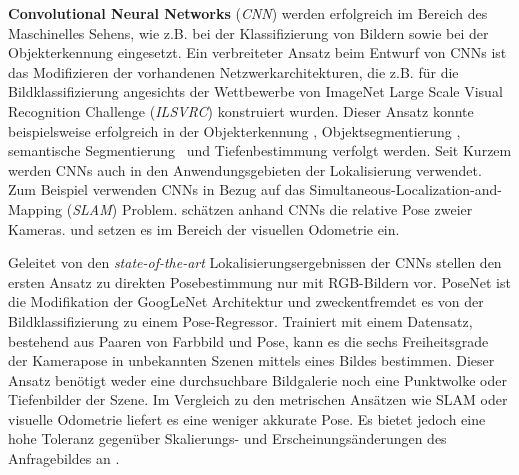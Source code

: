 \textbf{Convolutional Neural Networks} (\textit{CNN}) werden erfolgreich im Bereich des Maschinelles Sehens, wie z.B. bei der Klassifizierung von Bildern \cite{krizhevskyImageNetClassificationDeep2012, simonyanVeryDeepConvolutional2014, heDeepResidualLearning2015} sowie bei der Objekterkennung \cite{girshickRichFeatureHierarchies2013, renFasterRCNNRealTime2015b, girshickFastRCNN2015} eingesetzt. 
Ein verbreiteter Ansatz beim Entwurf von CNNs ist das Modifizieren der vorhandenen Netzwerkarchitekturen, die z.B. für die Bildklassifizierung angesichts der Wettbewerbe von ImageNet Large Scale Visual Recognition Challenge (\textit{ILSVRC}) \cite{russakovskyImageNetLargeScale2015} konstruiert wurden. Dieser Ansatz konnte beispielsweise erfolgreich in der Objekterkennung \cite{girshickFastRCNN2015}, Objektsegmentierung \cite{kokkinosPushingBoundariesBoundary2015, maninisConvolutionalOrientedBoundaries2016}, semantische Segmentierung \cite{nohLearningDeconvolutionNetwork2015, hazirbasFuseNetIncorporatingDepth2017a} und Tiefenbestimmung \cite{liDepthSurfaceNormal2015} verfolgt werden.
Seit Kurzem werden CNNs auch in den Anwendungsgebieten der Lokalisierung verwendet. Zum Beispiel verwenden  \citet{parisottoGlobalPoseEstimation2018} CNNs in Bezug auf das Simultaneous-Localization-and-Mapping (\textit{SLAM}) Problem. \citet{melekhovRelativeCameraPose2017} schätzen anhand CNNs die relative Pose zweier Kameras. \citet{costanteExploringRepresentationLearning2016} und \citet{wangDeepVOEndtoendVisual2017} setzen es im Bereich der visuellen Odometrie ein.

Geleitet von den \textit{state-of-the-art} Lokalisierungsergebnissen der CNNs stellen \citet{kendallPoseNetConvolutionalNetwork2015} den ersten Ansatz zu direkten Posebestimmung nur mit RGB-Bildern vor. PoseNet ist die Modifikation der GoogLeNet \cite{szegedyGoingDeeperConvolutions2015} Architektur und zweckentfremdet es von der Bildklassifizierung zu einem Pose-Regressor. Trainiert mit einem Datensatz, bestehend aus Paaren von Farbbild und Pose, kann es die sechs Freiheitsgrade der Kamerapose in unbekannten Szenen mittels eines Bildes bestimmen. Dieser Ansatz benötigt weder eine durchsuchbare Bildgalerie noch eine Punktwolke oder Tiefenbilder der Szene. Im Vergleich zu den metrischen Ansätzen wie SLAM oder visuelle Odometrie liefert es eine weniger akkurate Pose. Es bietet jedoch eine hohe Toleranz gegenüber Skalierungs- und Erscheinungsänderungen des Anfragebildes an \cite{piascoSurveyVisualBasedLocalization2018}.

